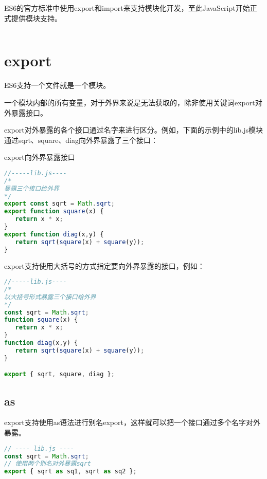 ES6的官方标准中使用export和import来支持模块化开发，至此JavaScript开始正式提供模块支持。






\begin{lstlisting}[language=JavaScript]

\end{lstlisting}



\section{export}

ES6支持一个文件就是一个模块。

一个模块内部的所有变量，对于外界来说是无法获取的，除非使用关键词export对外暴露接口。

export对外暴露的各个接口通过名字来进行区分。例如，下面的示例中的lib.js模块通过sqrt、square、diag向外界暴露了三个接口：



\begin{example}
export向外界暴露接口
\begin{lstlisting}[language=JavaScript]
//-----lib.js----
/*
暴露三个接口给外界
*/
export const sqrt = Math.sqrt;
export function square(x) {
   return x * x;
}
export function diag(x,y) {
   return sqrt(square(x) + square(y));
}
\end{lstlisting}
\end{example}

export支持使用大括号的方式指定要向外界暴露的接口，例如：






\begin{lstlisting}[language=JavaScript]
//-----lib.js----
/*
以大括号形式暴露三个接口给外界
*/
const sqrt = Math.sqrt;
function square(x) {
   return x * x;
}
function diag(x,y) {
   return sqrt(square(x) + square(y));
}

export { sqrt, square, diag };
\end{lstlisting}

\subsection{as}


export支持使用as语法进行别名export，这样就可以把一个接口通过多个名字对外暴露。

\begin{lstlisting}[language=JavaScript]
// ---- lib.js ----
const sqrt = Math.sqrt;
// 使用两个别名对外暴露sqrt
export { sqrt as sq1, sqrt as sq2 };
\end{lstlisting}

